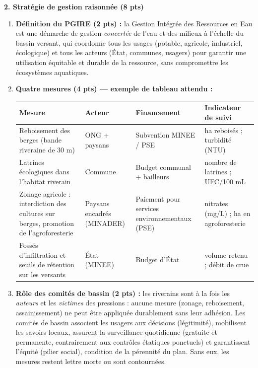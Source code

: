 \documentclass[11pt]{article}
\newcommand{\cle}[1]{{\popxbold\color{popdark}#1}}
\begin{document}
\begin{corrige}
\textbf{2. Stratégie de gestion raisonnée (8 pts)}
\begin{enumerate}
\item \textbf{Définition du PGIRE (2 pts) :} la Gestion Intégrée des Ressources en Eau est une démarche de gestion \emph{concertée} de l'eau et des milieux à l'échelle du \cle{bassin versant}, qui coordonne tous les usages (potable, agricole, industriel, écologique) et tous les acteurs (État, communes, usagers) pour garantir une utilisation équitable et durable de la ressource, sans compromettre les écosystèmes aquatiques.
\item \textbf{Quatre mesures (4 pts) — exemple de tableau attendu :}
\begin{center}
\begin{tabularx}{\linewidth}{|X|l|X|X|}\hline
\rowcolor{popblueL} \textbf{Mesure} & \textbf{Acteur} & \textbf{Financement} & \textbf{Indicateur de suivi} \\ \hline
Reboisement des berges (bande riveraine de 30 m) & ONG + paysans & Subvention MINEE / PSE & ha reboisés ; turbidité (NTU) \\ \hline
Latrines écologiques dans l'habitat riverain & Commune & Budget communal + bailleurs & nombre de latrines ; UFC/100 mL \\ \hline
Zonage agricole : interdiction des cultures sur berges, promotion de l'agroforesterie & Paysans encadrés (MINADER) & Paiement pour services environnementaux (PSE) & nitrates (mg/L) ; ha en agroforesterie \\ \hline
Fossés d'infiltration et seuils de rétention sur les versants & État (MINEE) & Budget d'État & volume retenu ; débit de crue \\ \hline
\end{tabularx}
\end{center}
\item \textbf{Rôle des comités de bassin (2 pts) :} les riverains sont à la fois les \emph{auteurs} et les \emph{victimes} des pressions : aucune mesure (zonage, reboisement, assainissement) ne peut être appliquée durablement sans leur adhésion. Les comités de bassin associent les usagers aux décisions (légitimité), mobilisent les savoirs locaux, assurent la surveillance quotidienne (gratuite et permanente, contrairement aux contrôles étatiques ponctuels) et garantissent l'équité (pilier social), condition de la pérennité du plan. Sans eux, les mesures restent lettre morte ou sont contournées.
\end{enumerate}
\end{corrige}
\end{document}
